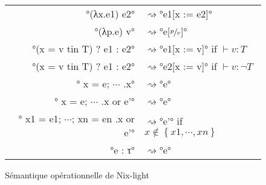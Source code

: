 \begin{figure}
  \center
  \def\leadsto{\ensuremath{\rightsquigarrow}}
  \begin{tabular}{rl}
  °(λx.e1) e2° &\leadsto °e1[x := e2]° \\
  °(λp.e) v° &\leadsto °e[$\sfrac{p}{v}$]° \\
  °(x = v tin T) ? e1 : e2° &\leadsto °e1[x := v]° \quad if $\vdash v : T$ \\
  °(x = v tin T) ? e1 : e2° &\leadsto °e2[x := v]° \quad if $\vdash v : \lnot T$ \\
  °{ x = e; $\cdots$ }.x° &\leadsto °e° \\
  °{ x = e; $\cdots$ }.x or e'° &\leadsto °e° \\
  °{ x1 = e1; $\cdots$; xn = en }.x or e'° &\leadsto °e'°
      \quad if $x \notin \left\{ x1, \cdots, xn \right\}$ \\
  °e : τ° &\leadsto °e°
  \end{tabular}
  \caption{Sémantique opérationnelle de Nix-light\label{nix-light::semantics}}
\end{figure}
